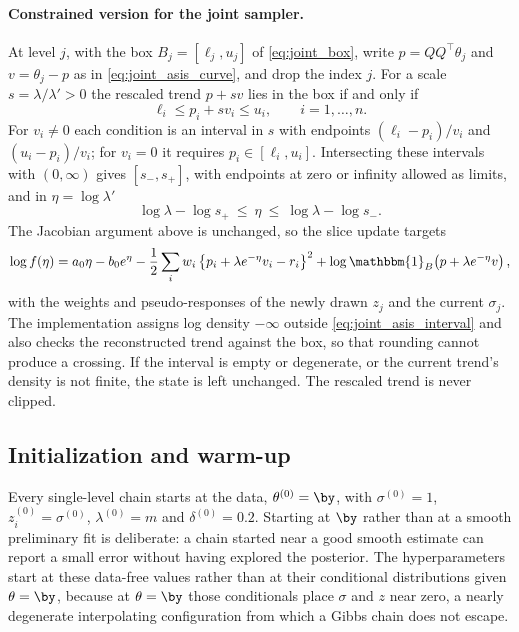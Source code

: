 \paragraph{Constrained version for the joint sampler.} At level $j$, with the box $B_j=[\ell_j,u_j]$ of \eqref{eq:joint_box}, write $p=QQ^\top\theta_j$ and $v=\theta_j-p$ as in \eqref{eq:joint_asis_curve}, and drop the index $j$. For a scale $s=\lambda/\lambda'>0$ the rescaled trend $p+sv$ lies in the box if and only if
\[
    \ell_i\leq p_i+s v_i\leq u_i,\qquad i=1,\ldots,n.
\]
For $v_i\ne0$ each condition is an interval in $s$ with endpoints $(\ell_i-p_i)/v_i$ and $(u_i-p_i)/v_i$; for $v_i=0$ it requires $p_i\in[\ell_i,u_i]$. Intersecting these intervals with $(0,\infty)$ gives $[s_-,s_+]$, with endpoints at zero or infinity allowed as limits, and in $\eta=\log\lambda'$
\begin{equation}
    \log\lambda-\log s_+\ \leq\ \eta\ \leq\ \log\lambda-\log s_-.
    \label{eq:joint_asis_interval}
\end{equation}
The Jacobian argument above is unchanged, so the slice update targets
\begin{equation}
    \log f(\eta)= a_0\eta-b_0e^\eta
       -\frac12\sum_i w_i\left\{p_i+\lambda e^{-\eta}v_i-r_i\right\}^2
       +\log\mathbbm{1}_{B}\!\left(p+\lambda e^{-\eta}v\right),
    \label{eq:joint_asis_density}
\end{equation}
with the weights and pseudo-responses of the newly drawn $z_j$ and the current $\sigma_j$. The implementation assigns log density $-\infty$ outside \eqref{eq:joint_asis_interval} and also checks the reconstructed trend against the box, so that rounding cannot produce a crossing. If the interval is empty or degenerate, or the current trend's density is not finite, the state is left unchanged. The rescaled trend is never clipped.

\subsection{Initialization and warm-up}
\label{app:pmala:init}

Every single-level chain starts at the data, $\theta^{(0)} = \by$, with $\sigma^{(0)} = 1$, $z_i^{(0)} = \sigma^{(0)}$, $\lambda^{(0)} = m$ and $\delta^{(0)} = 0.2$. Starting at $\by$ rather than at a smooth preliminary fit is deliberate: a chain started near a good smooth estimate can report a small error without having explored the posterior. The hyperparameters start at these data-free values rather than at their conditional distributions given $\theta = \by$, because at $\theta = \by$ those conditionals place $\sigma$ and $z$ near zero, a nearly degenerate interpolating configuration from which a Gibbs chain does not escape.

